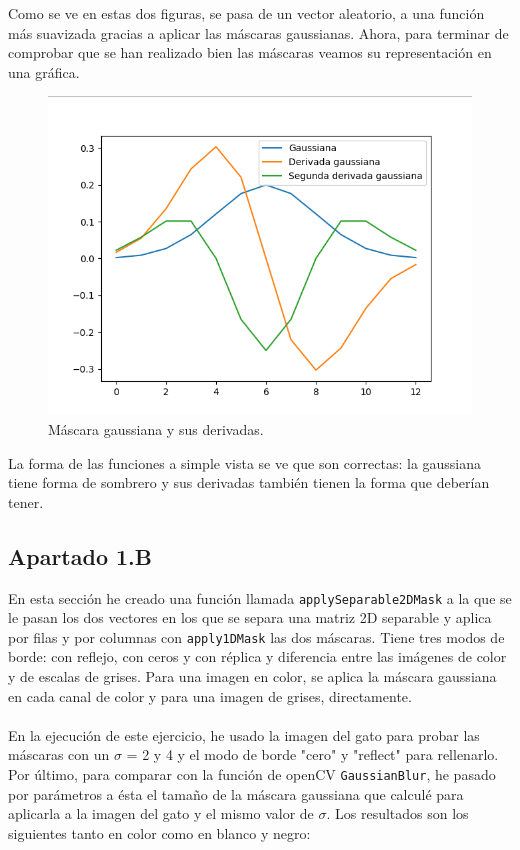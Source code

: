 \documentclass[12pt]{article}
\begin{document}
Como se ve en estas dos figuras, se pasa de un vector aleatorio, a una función más suavizada gracias a aplicar las máscaras gaussianas. Ahora, para terminar de comprobar que se han realizado bien las máscaras veamos su representación en una gráfica.

\begin{figure}[H]
\centering
\includegraphics[scale=0.45]{images/GaussianMask.png} 
\caption{Máscara gaussiana y sus derivadas.}
\label{etiqueta}
\end{figure}

La forma de las funciones a simple vista se ve que son correctas: la gaussiana tiene forma de sombrero y sus derivadas también tienen la forma que deberían tener.

\subsection*{Apartado 1.B}

En esta sección he creado una función llamada \texttt{applySeparable2DMask} a la que se le pasan los dos vectores en los que se separa una matriz 2D separable y aplica por filas y por columnas con \texttt{apply1DMask} las dos máscaras. Tiene tres modos de borde: con reflejo, con ceros y con réplica y diferencia entre las imágenes de color y de escalas de grises. Para una imagen en color, se aplica la máscara gaussiana en cada canal de color y para una imagen de grises, directamente.\\\\
En la ejecución de este ejercicio, he usado la imagen del gato para probar las máscaras con un $\sigma$ = 2 y 4 y el modo de borde "cero" y "reflect" para rellenarlo. Por último, para comparar con la función de openCV \texttt{GaussianBlur}, he pasado por parámetros a ésta el tamaño de la máscara gaussiana que calculé para aplicarla a la imagen del gato y el mismo valor de $\sigma$. Los resultados son los siguientes tanto en color como en blanco y negro:\\
\end{document}
